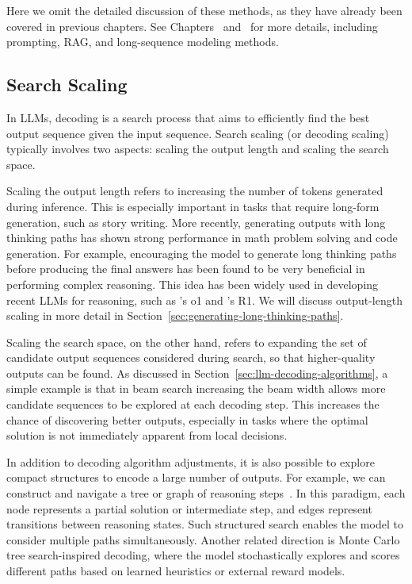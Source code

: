Here we omit the detailed discussion of these methods, as they have already been covered in previous chapters. See Chapters \ChapterLLM\ and \ChapterLLMPrompting\ for more details, including prompting, RAG, and long-sequence modeling methods.

\subsection{Search Scaling}

In LLMs, decoding is a search process that aims to efficiently find the best output sequence given the input sequence. Search scaling (or decoding scaling) typically involves two aspects: scaling the output length and scaling the search space.

Scaling the output length refers to increasing the number of tokens generated during inference. This is especially important in tasks that require long-form generation, such as story writing. More recently, generating outputs with long thinking paths has shown strong performance in math problem solving and code generation. For example, encouraging the model to generate long thinking paths before producing the final answers has been found to be very beneficial in performing complex reasoning. This idea has been widely used in developing recent LLMs for reasoning, such as \citet{openai:2024learning}'s o1 and \citet{deepseek:2025r1}'s R1. We will discuss output-length scaling in more detail in Section~\ref{sec:generating-long-thinking-paths}.

Scaling the search space, on the other hand, refers to expanding the set of candidate output sequences considered during search, so that higher-quality outputs can be found. As discussed in Section~\ref{sec:llm-decoding-algorithms}, a simple example is that in beam search increasing the beam width allows more candidate sequences to be explored at each decoding step. This increases the chance of discovering better outputs, especially in tasks where the optimal solution is not immediately apparent from local decisions.

In addition to decoding algorithm adjustments, it is also possible to explore compact structures to encode a large number of outputs. For example, we can construct and navigate a tree or graph of reasoning steps~\cite{yao-etal:2024tree}. In this paradigm, each node represents a partial solution or intermediate step, and edges represent transitions between reasoning states. Such structured search enables the model to consider multiple paths simultaneously. Another related direction is Monte Carlo tree search-inspired decoding, where the model stochastically explores and scores different paths based on learned heuristics or external reward models.

